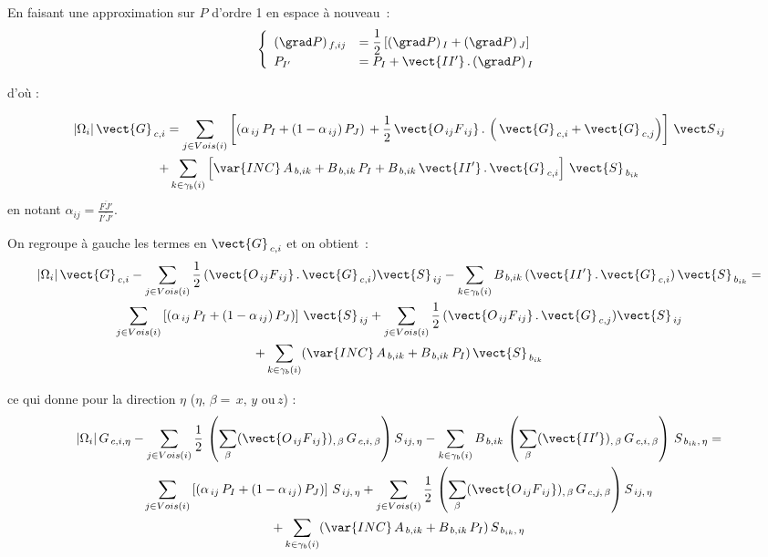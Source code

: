 En faisant une approximation sur $P$ d'ordre 1 en espace \`a nouveau~:
\begin{equation}\notag
\left\{\begin{array}{ll}
(\grad P)_{\,f,ij}& = \displaystyle\frac{1}{2}\left[(\grad P)_{\,I} +(\grad P)_{\,J}\right]\\
P_{I'}&= P_I + \vect {II'}\,.\,(\grad P)_{\,I}\\
\end{array}\right .
\end{equation}

d'o\`u :

\begin{multline}\notag
|\Omega_i|\,\vect{G}_{\,c,i}= \sum\limits_{j\in Vois(i)}\left[(\alpha_{\,ij}\,P_I
+ (1 - \alpha_{\,ij})\,P_J)\, + \frac{1}{2}\,\vect{O_{\,ij}F_{\,ij}}\,.\,
\left(\,\vect{G}_{\,c,i} +\vect{G}_{\,c,j}\right)\right]\,{\vect S_{\,ij}}\\
+\sum\limits_{k\in {\gamma_b(i)}}\left[ \var{INC}\,A_{\,b,ik} +
B_{\,b,ik}\,P_{I} + B_{\,b,ik}\,\vect {II'}\,.\,\vect{G}_{\,c,i}
\right]\,\vect{S}_{\,{b}_{ik}}
\end{multline}
en notant $\displaystyle\alpha_{ij}=\frac{\overline{FJ'}}{\overline{I'J'}}$.

On regroupe \`a gauche les termes en $\vect{G}_{\,c,i}$ et on obtient~:
\begin{multline}\label{Base_Gradrc_eq_reconstruction}
|\Omega_i|\,\vect{G}_{\,c,i} -
\sum\limits_{j\in Vois(i)}\frac{1}{2}\,(\vect{O_{\,ij}F_{\,ij}}\,.\,\vect{G}_{\,c,i})\vect{S}_{\,ij}
-\sum\limits_{k\in {\gamma_b(i)}} B_{\,b,ik}\,(\vect{II'}\,.\,\vect{G}_{\,c,i})\,\vect{S}_{\,b_{ik}}
= \\
\sum\limits_{j\in Vois(i)}\left[
(\alpha_{\,ij}\,P_I + (1 - \alpha_{\,ij})\,P_J)\right]\,{\vect{S}_{\,ij}}
+\sum\limits_{j\in Vois(i)}\frac{1}{2}\,(\vect{O_{\,ij}F_{\,ij}}\,.\,\vect{G}_{\,c,j})\vect{S}_{\,ij}\\
+\sum\limits_{k\in {\gamma_b(i)}}(\var{INC}\,A_{\,b,ik} + B_{\,b,ik}\,P_{I})\,\vect{S}_{\,{b}_{ik}}
\end{multline}

ce qui donne pour la direction $\eta$ ($\eta ,\,\beta = \, x, \,y\,\, \text{ou} \, z$)  :
\begin{multline}\label{Base_Gradrc_eq_reconstruction_comp}
|\Omega_i|\,{G}_{\,c,i,\eta} -
\sum\limits_{j\in Vois(i)}\frac{1}{2}\,\left(\sum\limits_{\beta}(\vect{O_{\,ij}F_{\,ij}})_{,\,\beta}\,{G}_{\,c,i,\,\beta}\right){S}_{\,ij,\,\eta}
-\sum\limits_{k\in {\gamma_b(i)}} B_{\,b,ik}\,\left(\sum\limits_{\beta}(\vect{II'})_{,\,\beta}\,{G}_{\,c,i,\,\beta}\right)\,{S}_{\,b_{ik},\,\eta}
= \\
\sum\limits_{j\in Vois(i)}\left[
(\alpha_{\,ij}\,P_I + (1 - \alpha_{\,ij})\,P_J)\right]\,{{S}_{\,ij,\,\eta}}
+\sum\limits_{j\in Vois(i)}\frac{1}{2}\,\left(\sum\limits_{\beta}(\vect{O_{\,ij}F_{\,ij}})_{,\,\beta}\,{G}_{\,c,j,\,\beta}\right){S}_{\,ij,\,\eta}\\
+\sum\limits_{k\in {\gamma_b(i)}}(\var{INC}\,A_{\,b,ik} + B_{\,b,ik}\,P_{I})\,{S}_{\,{b}_{ik},\,\eta}
\end{multline}
